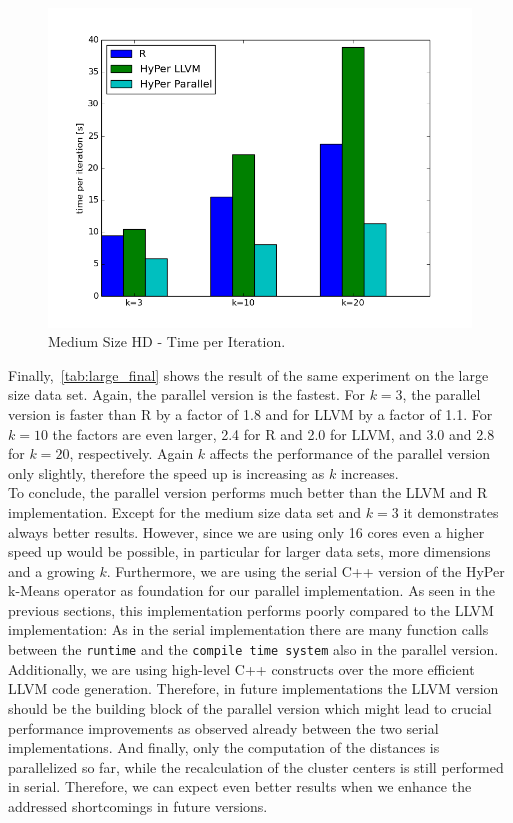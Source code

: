 \begin{figure}[htsb]
  \centering
  \includegraphics[scale=0.5, trim="0cm 1.5cm 0cm 0cm"]{figures/charts/15Mxhd_final}
  \caption[Medium Size HD - Time per Iteration (Parallel)]{Medium Size HD - Time per Iteration.}
  \label{fig:final_15_hd}
\end{figure}

Finally,~\autoref{tab:large_final} shows the result of the same experiment on the large size data set. Again, the parallel version is the fastest. For $k = 3$, the parallel version is faster than R by a factor of 1.8 and for LLVM by a factor of 1.1. For $k = 10$ the factors are even larger, 2.4 for R and 2.0 for LLVM, and 3.0 and 2.8 for $k = 20$, respectively. Again $k$ affects the performance of the parallel version only slightly, therefore the speed up is increasing as $k$ increases.
\\
To conclude, the parallel version performs much better than the LLVM and R implementation. Except for the medium size data set and $k = 3$ it demonstrates always better results. However, since we are using only 16 cores even a higher speed up would be possible, in particular for larger data sets, more dimensions and a growing $k$. Furthermore, we are using the serial C++ version of the HyPer k-Means operator as foundation for our parallel implementation. As seen in the previous sections, this implementation performs poorly compared to the LLVM implementation: As in the serial implementation there are many function calls between the \texttt{runtime} and the \texttt{compile time system} also in the parallel version. Additionally, we are using high-level C++ constructs over the more efficient LLVM code generation. Therefore, in future implementations the LLVM version should be the building block of the parallel version which might lead to crucial performance improvements as observed already between the two serial implementations. And finally, only the computation of the distances is parallelized so far, while the recalculation of the cluster centers is still performed in serial. Therefore, we can expect even better results when we enhance the addressed shortcomings in future versions.


